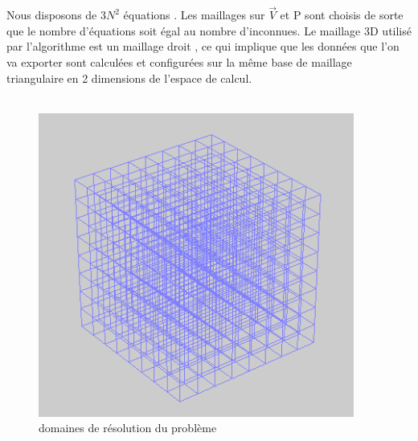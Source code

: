 \documentclass[a4paper,12pt,titlepage]{report}
\begin{document}
\begin{onehalfspace}
Nous disposons de $3N^2$ équations . Les maillages sur $\vec{V}$ et P sont choisis de sorte que le nombre d'équations soit égal au nombre d'inconnues.
Le maillage 3D utilisé par l'algorithme est un maillage droit , ce qui implique que les données que l'on va exporter sont calculées et configurées sur la même base  de maillage triangulaire en 2 dimensions de l'espace de calcul. 
	\\\
\begin{figure}
\center
\includegraphics[height = 10cm, keepaspectratio]{graphes/maillage_droit.png}
\caption{domaines de résolution du problème}																													
\end{figure}


\end{onehalfspace}
\end{document}
